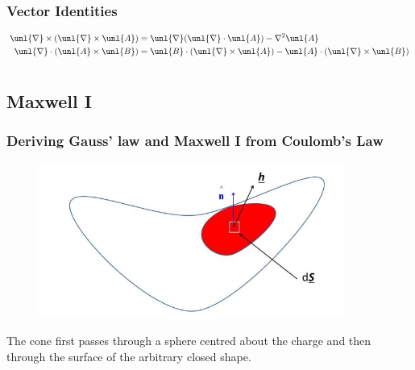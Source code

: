 \documentclass[a4paper, 11pt, normalem]{report}
\newcommand\del{\unl{\nabla}}
\begin{document}
\subsection{Vector Identities}
\begin{align*}
    \del \times (\del \times \unl{A}) &= \del(\del \cdot \unl{A}) - \nabla^2 \unl{A} \\
    \del \cdot (\unl{A} \times \unl{B}) &= \unl{B}\cdot(\del \times \unl{A}) - \unl{A} \cdot (\del \times \unl{B})
\end{align*}

\chapter{}
\section{Maxwell \RN{1}}
\subsection{Deriving Gauss' law and Maxwell \RN{1} from Coulomb's Law}
\begin{figure}
    \begin{center}
        \includegraphics[scale=0.4]{fluxvec.png}
    \end{center}
\end{figure}
The cone first passes through a sphere centred about the charge and then through the surface of the arbitrary closed shape.
\end{document}

